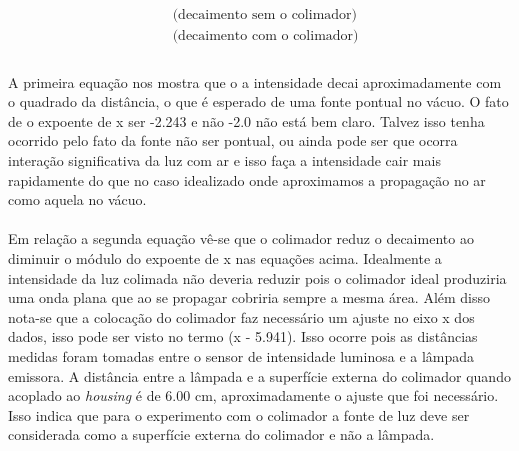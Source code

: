 \documentclass[a4paper,11pt]{article}
\begin{document}
\begin{equation}
	\begin{array}{ll}
		  & \mbox{(decaimento sem o colimador)}\\	
		  & \mbox{(decaimento com o colimador)}\\		
	\end{array}
	\label{eq:1-6}
\end{equation}


\paragraph{} A primeira equação nos mostra que o a intensidade decai aproximadamente com o quadrado da distância, o que é esperado de uma fonte pontual no vácuo. O fato de o expoente de x ser -2.243 e não -2.0 não está bem claro. Talvez isso tenha ocorrido pelo fato da fonte não ser pontual, ou ainda pode ser que ocorra interação significativa da luz com ar e isso faça a intensidade cair mais rapidamente do que no caso idealizado onde aproximamos a propagação no ar como aquela no vácuo. 

\paragraph{} Em relação a segunda equação vê-se que o colimador reduz o decaimento ao diminuir o módulo do expoente de x nas equações acima. Idealmente a intensidade da luz colimada não deveria reduzir pois o colimador ideal produziria uma onda plana que ao se propagar cobriria sempre a mesma área. Além disso nota-se que a colocação do colimador faz necessário um ajuste no eixo x dos dados, isso pode ser visto no termo (x - 5.941). Isso ocorre pois as distâncias medidas foram tomadas entre o sensor de intensidade luminosa e a lâmpada emissora. A distância entre a lâmpada e a superfície externa do colimador quando acoplado ao \textit{housing} é de 6.00 cm, aproximadamente o ajuste que foi necessário. Isso indica que para o experimento com o colimador a fonte de luz deve ser considerada como a superfície externa do colimador e não a lâmpada.
\end{document}
